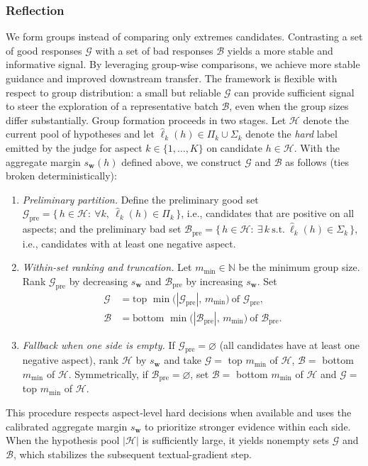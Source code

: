 \documentclass{article}
\theoremstyle{plain}
\theoremstyle{definition}
\theoremstyle{remark}
\begin{document}
\subsubsection{Reflection}
We form groups instead of comparing only extremes candidates. Contrasting a set of good responses \(\mathcal{G}\) with a set of bad responses \(\mathcal{B}\) yields a more stable and informative signal. By leveraging group-wise comparisons, we achieve more stable guidance and improved downstream transfer. The framework is flexible with respect to group distribution: a small but reliable $\mathcal{G}$ can provide sufficient signal to steer the exploration of a representative batch $\mathcal{B}$, even when the group sizes differ substantially.
%
Group formation proceeds in two stages. Let \(\mathcal{H}\) denote the current pool of hypotheses and let \(\hat\ell_k(h)\in \Pi_k\cup\Sigma_k\) denote the \emph{hard} label emitted by the judge for aspect \(k\in\{1,\dots,K\}\) on candidate \(h\in\mathcal{H}\). With the aggregate margin \(s_{\mathbf w}(h)\) defined above, we construct \(\mathcal{G}\) and \(\mathcal{B}\) as follows (ties broken deterministically):
\begin{enumerate}
  \item \emph{Preliminary partition.} Define the preliminary good set
  \(\mathcal{G}_{\text{pre}}=\{\,h\in\mathcal{H}:\ \forall k,\ \hat\ell_k(h)\in \Pi_k\,\}\),
  i.e., candidates that are positive on all aspects; and the preliminary bad set
  \(\mathcal{B}_{\text{pre}}=\{\,h\in\mathcal{H}:\ \exists\,k\ \text{s.t.}\ \hat\ell_k(h)\in \Sigma_k\,\}\),
  i.e., candidates with at least one negative aspect.
  \item \emph{Within‑set ranking and truncation.} Let \(m_{\min}\in\mathbb{N}\) be the minimum group size. Rank \(\mathcal{G}_{\text{pre}}\) by decreasing \(s_{\mathbf w}\) and \(\mathcal{B}_{\text{pre}}\) by increasing \(s_{\mathbf w}\). Set
  \[
  \begin{aligned}
    \mathcal{G} &= \text{top }\min\!\bigl(|\mathcal{G}_{\text{pre}}|,\,m_{\min}\bigr)\ \text{of }\mathcal{G}_{\text{pre}},\\
    \mathcal{B} &= \text{bottom }\min\!\bigl(|\mathcal{B}_{\text{pre}}|,\,m_{\min}\bigr)\ \text{of }\mathcal{B}_{\text{pre}}.
  \end{aligned}
  \]
  \item \emph{Fallback when one side is empty.} If \(\mathcal{G}_{\text{pre}}=\varnothing\) (all candidates have at least one negative aspect), rank \(\mathcal{H}\) by \(s_{\mathbf w}\) and take
  \(\mathcal{G}=\) top \(m_{\min}\) of \(\mathcal{H}\), \(\mathcal{B}=\) bottom \(m_{\min}\) of \(\mathcal{H}\).
  Symmetrically, if \(\mathcal{B}_{\text{pre}}=\varnothing\), set \(\mathcal{B}=\) bottom \(m_{\min}\) of \(\mathcal{H}\) and \(\mathcal{G}=\) top \(m_{\min}\) of \(\mathcal{H}\).
\end{enumerate}
This procedure respects aspect‑level hard decisions when available and uses the calibrated aggregate margin \(s_{\mathbf w}\) to prioritize stronger evidence within each side. When the hypothesis pool $|\mathcal{H}|$ is sufficiently large, it yields nonempty sets $\mathcal{G}$ and $\mathcal{B}$, which stabilizes the subsequent textual-gradient step.
\end{document}
